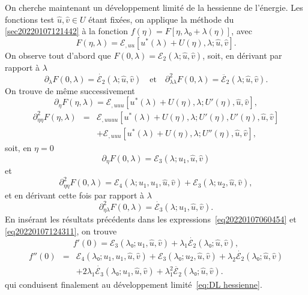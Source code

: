 \documentclass{article}
\begin{document}
On cherche maintenant un développement limité de la hessienne de
l'énergie. Les fonctions test $\hat{u}, \hat{v}∈U$ étant
fixées, on applique la méthode du
{\textsection}\ref{sec20220107121442} à la fonction $f (η) = F [η,
λ₀ + λ (η)]$, avec
\begin{equation} F (η, λ) =ℰ_{, u  u} [u^{\ast} (λ) + U
   (η), λ ; \hat{u}, \hat{v}] . \end{equation}
On observe tout d'abord que $F (0, λ) =ℰ_2 (λ ; \hat{u},
\hat{v})$, soit, en dérivant par rapport à $λ$
\begin{equation} \partial_{λ} F (0, λ) = \dot{ℰ_2} (λ ; \hat{u},
   \hat{v}) \quad \text{et} \quad \partial_{λ  λ}^2 F (0,
   λ) = \ddot{ℰ_2} (λ ; \hat{u}, \hat{v}) . \end{equation}
On trouve de même successivement
\begin{equation} \partial_{η} F (η, λ) =ℰ_{, u  u  u}
   [u^{\ast} (λ) + U (η), λ ; U' (η), \hat{u}, \hat{v}], \end{equation}
\begin{eqnarray}
  \partial_{η  η}^2 F (η, λ) & = & ℰ_{, u
   u  u  u} [u^{\ast} (λ) + U (η), λ ;
  U' (η), U' (η), \hat{u}, \hat{v}] \nonumber\\
  &  &  +ℰ_{, u  u  u} [u^{\ast} (λ)
  + U (η), λ ; U'' (η), \hat{u}, \hat{v}], \nonumber
\end{eqnarray}
soit, en $η = 0$
\begin{equation} \partial_{η} F (0, λ) =ℰ_3 (λ ; u_1, \hat{u},
   \hat{v}) \text{} \end{equation}
et
\begin{equation} \partial_{η  η}^2 F (0, λ) =ℰ_4 (λ ;
   u_1, u_1, \hat{u}, \hat{v}) +ℰ_3 (λ ; u_2, \hat{u},
   \hat{v}), \end{equation}
et en dérivant cette fois par rapport à $λ$
\begin{equation} \partial_{η  λ}^2 F (0, λ) = \dot{ℰ_3}
   (λ ; u_1, \hat{u}, \hat{v}) . \end{equation}
En insérant les résultats précédents dans les
expressions~\eqref{eq20220107060454} et \eqref{eq20220107124311}, on trouve
\begin{equation} f' (0) =ℰ_3 (λ₀ ; u_1, \hat{u}, \hat{v}) + λ_1
   \dot{ℰ_2} (λ₀ ; \hat{u}, \hat{v}), \end{equation}
\begin{eqnarray}
  f'' (0) & = & ℰ_4 (λ₀ ; u_1, u_1, \hat{u}, \hat{v})
  +ℰ_3 (λ₀ ; u_2, \hat{u}, \hat{v}) + λ_2
  \dot{ℰ_2} (λ₀ ; \hat{u}, \hat{v}) \nonumber\\
  &  &   + 2 λ_1  \dot{ℰ_3} (λ₀ ;
  u_1, \hat{u}, \hat{v}) + λ_1^2  \ddot{ℰ_2} (λ₀ ;
  \hat{u}, \hat{v}) . \nonumber
\end{eqnarray}
qui conduisent finalement au développement limité~\eqref{eq:DL
hessienne}.
\end{document}
